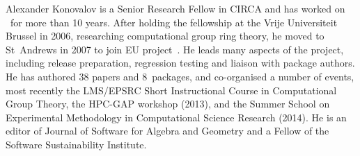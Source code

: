 \begin{participant}[type=PI,PM=24,gender=male]{Alexander Konovalov}
  is a Senior Research Fellow in CIRCA and has worked on \GAP\ for more than 10 years.
  After holding the fellowship at the Vrije Universiteit Brussel in 2006, researching
  computational group ring theory, he moved to St~Andrews in 2007 to join EU
  project~\scienceproject. He leads many aspects of the \GAP project, including release
  preparation, regression testing and liaison with package authors. He has authored 38
  papers and 8~\GAP packages, and co-organised a number of events, most recently the
  LMS/EPSRC Short Instructional Course in Computational Group Theory,
the HPC-GAP workshop (2013), and
the Summer School on Experimental Methodology in Computational Science Research
(2014).
He is an editor of Journal of Software for Algebra and Geometry 
and a Fellow of the Software Sustainability Institute.
\end{participant}
